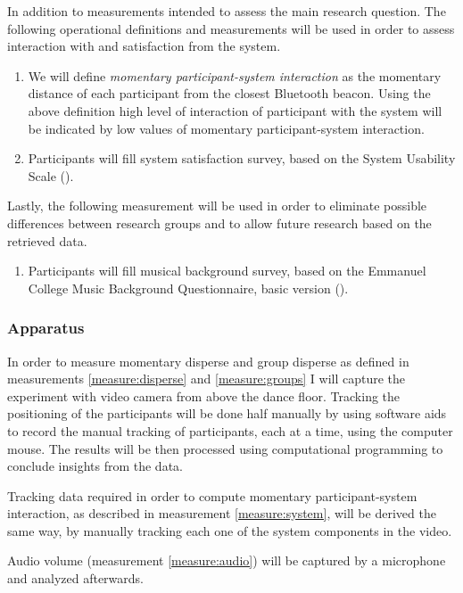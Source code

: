 \documentclass[a4paper,11pt]{article}
\newcommand{\definition}[1]{\emph{#1}}
\begin{document}
In addition to measurements intended to assess the main research question.
The following operational definitions and measurements will be used in order to assess interaction with and satisfaction from the system.
\begin{enumerate}[resume]
	\item \label{measure:system} We will define \definition{momentary participant-system interaction} as the momentary distance of each participant from the closest Bluetooth beacon.
	Using the above definition high level of interaction of participant with the system will be indicated by low values of momentary participant-system interaction.
	\item \label{measure:survey:usability} Participants will fill system satisfaction survey, based on the System Usability Scale (\cite{brooke96}).
\end{enumerate}
Lastly, the following measurement will be used in order to eliminate possible differences between research groups and to allow future research based on the retrieved data.
\begin{enumerate}[resume]
	\item \label{measure:survey:musical} Participants will fill musical background survey, based on the Emmanuel College Music Background Questionnaire, basic version (\cite{web:zhao12}).
\end{enumerate}

\subsubsection{Apparatus}

In order to measure momentary disperse and group disperse as defined in measurements \ref{measure:disperse} and \ref{measure:groups} I will capture the experiment with video camera from above the dance floor.
Tracking the positioning of the participants will be done half manually by using software aids to record the manual tracking of participants, each at a time, using the computer mouse.
The results will be then processed using computational programming to conclude insights from the data.

Tracking data required in order to compute momentary participant-system interaction, as described in measurement \ref{measure:system}, will be derived the same way, by manually tracking each one of the system components in the video.

Audio volume (measurement \ref{measure:audio}) will be captured by a microphone and analyzed afterwards.
\end{document}

